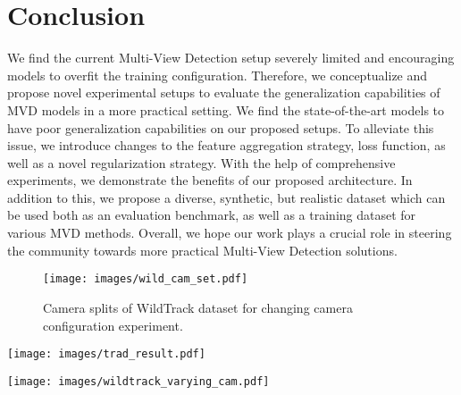 \documentclass[letterpaper, 10 pt, conference]{ieeeconf}  \usepackage{times}
\newcommand{\wildtrack}{WildTrack }
\newcommand{\multiviewx}{MultiViewX }
\begin{document}
\section{Conclusion}
We find the current Multi-View Detection setup severely limited and encouraging models to overfit the training configuration. Therefore, we conceptualize and propose novel experimental setups to evaluate the generalization capabilities of MVD models in a more practical setting. We find the state-of-the-art models to have poor generalization capabilities on our proposed setups. To alleviate this issue, we introduce changes to the feature aggregation strategy, loss function, as well as a novel regularization strategy. With the help of comprehensive experiments, we demonstrate the benefits of our proposed architecture. In addition to this, we propose a diverse, synthetic, but realistic dataset which can be used both as an evaluation benchmark, as well as a training dataset for various MVD methods. Overall, we hope our work plays a crucial role in steering the community towards more practical Multi-View Detection solutions. 





\clearpage
\appendix




\begin{figure}[t]
    \centering
    \texttt{[image: images/wild\_cam\_set.pdf]}
    \caption{Camera splits of \wildtrack dataset for changing camera configuration experiment.}
    \label{fig:wildtrack_cam_split}
\end{figure}

\begin{figure*}[t]
    \centering
    \texttt{[image: images/trad\_result.pdf]}
    \caption{ Sample frames from \wildtrack and \multiviewx dataset with corresponding occupancy maps of ground truth, our result MVDet, MVDeTr and SHOT for comparison. We can see the clusters forming in the MVDet predictions, in contrast our method gives much sharper and distinct predictions.}
    \label{fig:wildtrack_results}
\end{figure*}

\begin{figure*}[t]
    \centering
    \texttt{[image: images/wildtrack\_varying\_cam.pdf]}
    \caption{Occupancy maps for varying number of cameras on \wildtrack dataset when trained on seven cameras and tested on varying subsets of the cameras.}
    \label{fig:wildtrack_varying_cam}
\end{figure*}
\end{document}
